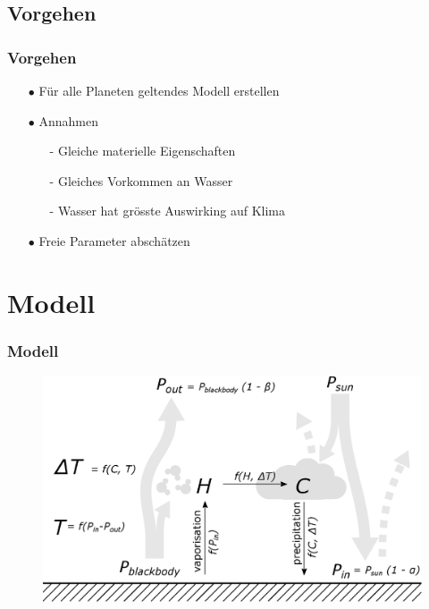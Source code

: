 \documentclass[ngerman]{beamer}
\begin{document}
\subsection{Vorgehen}
\begin{frame}
\frametitle{Vorgehen}
\begin{itemize}

	\item[$\bullet$] Für alle Planeten geltendes Modell  erstellen
	\item[$\bullet$] Annahmen
	\begin{itemize}
		\item[-] Gleiche materielle Eigenschaften
		\item[-] Gleiches Vorkommen an Wasser
		\item[-] Wasser hat grösste Auswirking auf Klima
	\end{itemize}
	
	\item[$\bullet$] Freie Parameter abschätzen
\end{itemize}
\end{frame}


\section{Modell} 
\begin{frame}
	\frametitle{Modell}
	\begin{figure}
		\includegraphics[width=\linewidth]{Model.eps}
	\end{figure}
\end{frame}
\end{document}
